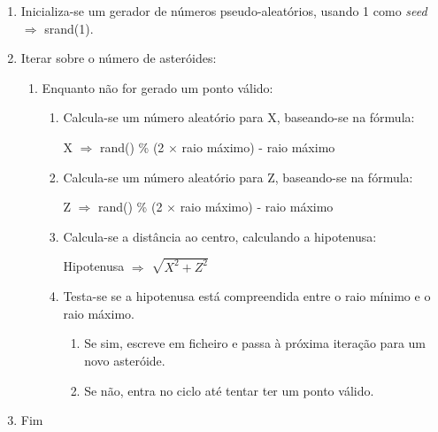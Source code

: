 \documentclass[a4paper]{article}
\begin{document}
 \ttfamily
\begin{enumerate}
  \item Inicializa-se um gerador de números pseudo-aleatórios, usando 1 como \emph{seed} $\Rightarrow$ srand(1).
  \item Iterar sobre o número de asteróides:
  \begin{enumerate}
    \item Enquanto não for gerado um ponto válido:
    \begin{enumerate}
    	\item Calcula-se um número aleatório para X, baseando-se na fórmula:

	 \vspace{0.5cm}

	 \hspace{0.0cm} X $\Rightarrow$ rand() \% (2 $\times$ raio máximo) - raio máximo

	 \vspace{0.5cm}

	 \item Calcula-se um número aleatório para Z, baseando-se na fórmula:

	 \vspace{0.5cm}

	 \hspace{0.0cm} Z $\Rightarrow$ rand() \% (2 $\times$ raio máximo) - raio máximo

	 \vspace{0.5cm}

	 \item Calcula-se a distância ao centro, calculando a hipotenusa:

	 \vspace{0.5cm}

	 \hspace{0.0cm} Hipotenusa $\Rightarrow$ $\sqrt{X^2 + Z^2}$

	 \vspace{0.5cm}

	 \item Testa-se se a hipotenusa está compreendida entre o raio mínimo e o raio máximo.
	 \begin{enumerate}
	 \item Se sim, escreve em ficheiro e passa à próxima iteração para um novo asteróide.
	 \item Se não, entra no ciclo até tentar ter um ponto válido.
	 \end{enumerate}

    \end{enumerate}

    \end{enumerate}

    \item Fim
    \end{enumerate}
    \rmfamily
\end{document}
